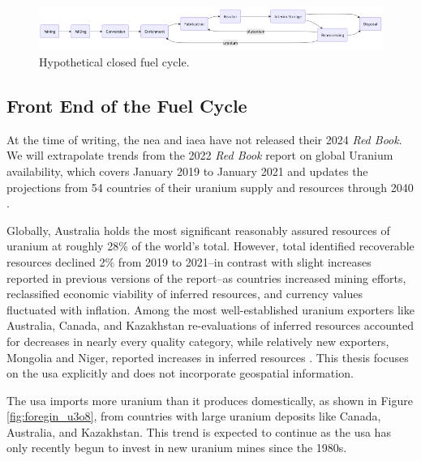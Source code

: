 \begin{figure}[H]
      \centering
      \includegraphics[scale=0.55]{images/nfc/closed_fc.png}
      \caption{Hypothetical closed fuel cycle.}
      \label{fig:closed_fc}
\end{figure}


\subsection{Front End of the Fuel Cycle}
\label{sec:front_end}
At the time of writing, the \gls{nea} and \gls{iaea} have not released their  2024 \textit{Red Book}. We will extrapolate trends from the 2022 \textit{Red Book} report on global Uranium availability, which covers January 2019 to January 2021 and updates the projections from 54 countries of their uranium supply and resources through 2040 \cite{nea_red_book_2022}.

Globally, Australia holds the most significant reasonably assured resources
of uranium at roughly 28\% of the world's total. However, total identified recoverable resources declined 2\% from 2019 to 2021--in contrast with slight increases reported in previous versions of the report--as countries increased mining efforts, reclassified economic viability of inferred resources, and currency values fluctuated with inflation. Among the most well-established uranium exporters like Australia, Canada, and Kazakhstan re-evaluations of inferred resources accounted for decreases in nearly every quality category, while relatively new exporters, Mongolia and Niger, reported increases in inferred resources \cite{nea_red_book_2022}. This thesis focuses on the \gls{usa} explicitly and does not incorporate geospatial information.

The \gls{usa} imports more uranium than it produces domestically, as shown in Figure \ref{fig:foregin_u3o8}, from countries with large uranium deposits like Canada, Australia, and Kazakhstan. This trend is expected to continue as the \gls{usa} has only recently begun to invest in new uranium mines since the 1980s.

